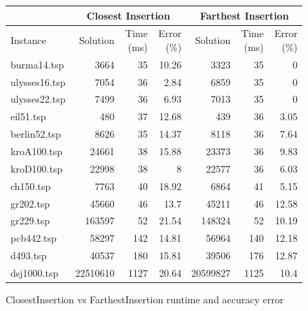 \begin{figure}
    \centering

    \begin{tabular}{lrrrrrr}
    \toprule
    \multicolumn{1}{c}{ } & \multicolumn{3}{c}{Closest Insertion} & \multicolumn{3}{c}{Farthest Insertion} \\
    \hline
    Instance & Solution &   Time (ms) &   Error (\%) & Solution &   Time (ms) &   Error (\%) \\
    \hline
    burma14.tsp   &     3664 &          35 &       10.26 &       3323 &          35 &        0    \\
    ulysses16.tsp &     7054 &          36 &        2.84 &       6859 &          35 &        0    \\
    ulysses22.tsp &     7499 &          36 &        6.93 &       7013 &          35 &        0    \\
    eil51.tsp     &      480 &          37 &       12.68 &        439 &          36 &        3.05 \\
    berlin52.tsp  &     8626 &          35 &       14.37 &       8118 &          36 &        7.64 \\
    kroA100.tsp   &    24661 &          38 &       15.88 &      23373 &          36 &        9.83 \\
    kroD100.tsp   &    22998 &          38 &        8    &      22577 &          36 &        6.03 \\
    ch150.tsp     &     7763 &          40 &       18.92 &       6864 &          41 &        5.15 \\
    gr202.tsp     &    45660 &          46 &       13.7  &      45211 &          46 &       12.58 \\
    gr229.tsp     &   163597 &          52 &       21.54 &     148324 &          52 &       10.19 \\
    pcb442.tsp    &    58297 &         142 &       14.81 &      56964 &         140 &       12.18 \\
    d493.tsp      &    40537 &         180 &       15.81 &      39506 &         176 &       12.87 \\
    dsj1000.tsp   & 22510610 &        1127 &       20.64 &   20599827 &        1125 &       10.4  \\
    \bottomrule
    \end{tabular}

    \caption{ClosestInsertion vs FarthestInsertion runtime and accuracy error}
    \label{table:closest-farthest-insertion-runtime-accuracy}
\end{figure}


